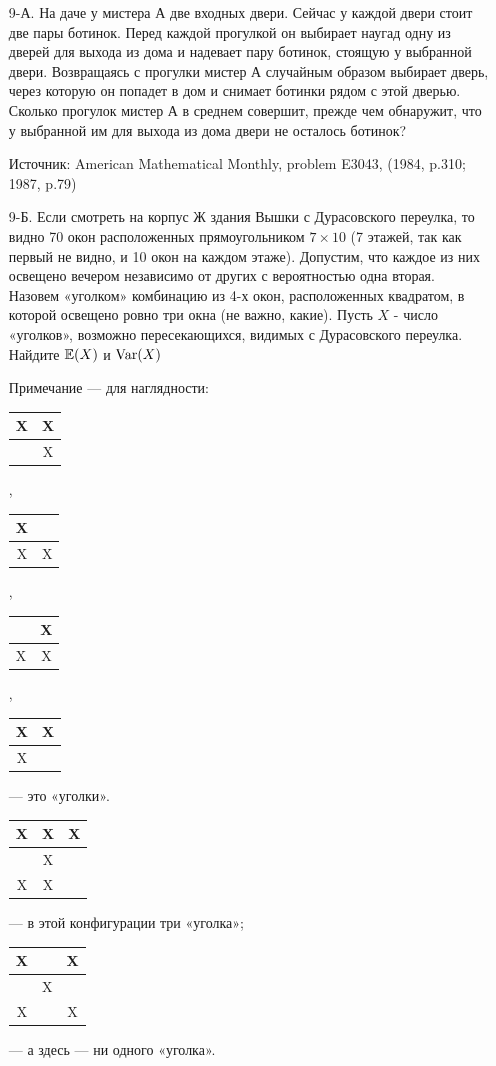 \begin{enumerate}
\item[9-А.] На даче у мистера А две входных двери. Сейчас у каждой двери стоит две
пары ботинок. Перед каждой прогулкой он выбирает наугад одну из дверей для выхода
из дома и надевает пару ботинок, стоящую у выбранной двери. Возвращаясь с прогулки
мистер А случайным образом выбирает дверь, через которую он попадет в дом и снимает
ботинки рядом с этой дверью. Сколько прогулок мистер А в среднем совершит, прежде
чем обнаружит, что у выбранной им для выхода из дома двери не осталось ботинок?

Источник: American Mathematical Monthly, problem E3043, (1984, p.310; 1987, p.79)

\item[9-Б.] Если смотреть на корпус Ж здания Вышки с Дурасовского переулка, то
видно 70 окон расположенных прямоугольником $7\times 10$ (7 этажей, так как первый
не видно, и 10 окон на каждом этаже). Допустим, что каждое из них освещено вечером
независимо от других с вероятностью одна вторая. Назовем «уголком» комбинацию из
4-х окон, расположенных квадратом, в которой освещено ровно три окна (не важно, какие).
Пусть $X$ - число «уголков», возможно пересекающихся, видимых с Дурасовского переулка.
Найдите $\operatorname{\mathbb{E}}(X)$ и $\operatorname{Var}(X)$

Примечание — для наглядности:
\begin{tabular}{|c|c|}
  \hline
  X & X\\
  \hline
    & X \\
  \hline
\end{tabular},
\begin{tabular}{|c|c|}
  \hline
  X & \\
  \hline
  X & X \\
  \hline
\end{tabular},
\begin{tabular}{|c|c|}
  \hline
   & X\\
  \hline
  X & X \\
  \hline
\end{tabular},
\begin{tabular}{|c|c|}
  \hline
  X & X\\
  \hline
  X &  \\
  \hline
\end{tabular} — это «уголки». \\
\begin{tabular}{|c|c|c|}
  \hline
  X & X & X\\
  \hline
    & X & \\
  \hline
  X & X & \\
  \hline

\end{tabular} — в этой конфигурации три «уголка»;
\begin{tabular}{|c|c|c|}
  \hline
  X &  & X\\
  \hline
    & X & \\
  \hline
  X &  & X\\
  \hline

\end{tabular} — а здесь — ни одного «уголка».
\end{enumerate}
